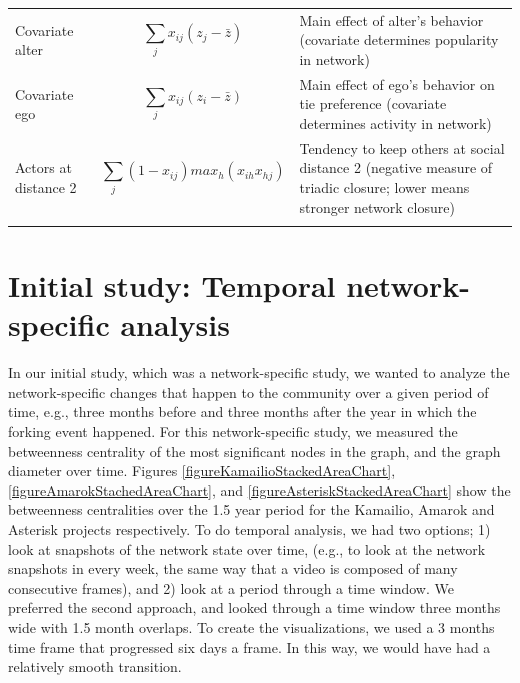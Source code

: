 \documentclass{report}
\begin{document}
\begin{table}[!ht]
\begin{tabular}{m{} m{} m{}}
Covariate alter & \begin{equation*} \sum_j x_{ij} (z_j - \bar z) \end{equation*} & Main effect of alter's behavior (covariate determines popularity in network) \\ 
Covariate ego & \begin{equation*} \sum_j x_{ij} (z_i - \bar z) \end{equation*} & Main effect of ego's behavior on tie preference (covariate determines activity in network) \\
Actors at distance 2 & \begin{equation*} \sum_j (1 - x_{ij}) max_h (x_{ih}x_{hj}) \end{equation*} & Tendency to keep others at social distance 2 (negative measure of triadic closure; lower means stronger network closure) \\ 
\noalign{\smallskip}\hline
\end{tabular}
\end{table}
\section{Initial study: Temporal network-specific analysis}
\label{sectionInitialStudy}
In our initial study\cite{AzarbakhtOpenSym2013}\cite{AzarbakhtOSS2013}\cite{AzarbakhtVLHCC2014}, which was a network-specific study, we wanted to analyze the network-specific changes that happen to the community over a given period of time, e.g., three months before and three months after the year in which the forking event happened. For this network-specific study, we measured the betweenness centrality \cite{Brandes} of the most significant nodes in the graph, and the graph diameter over time. Figures \ref{figureKamailioStackedAreaChart}, \ref{figureAmarokStachedAreaChart}, and \ref{figureAsteriskStackedAreaChart} show the betweenness centralities over the 1.5 year period for the Kamailio, Amarok and Asterisk projects respectively. To do temporal analysis, we had two options; 1) look at snapshots of the network state over time, (e.g., to look at the network snapshots in every week, the same way that a video is composed of many consecutive frames), and 2) look at a period through a time window. We preferred the second approach, and looked through a time window three months wide with 1.5 month overlaps. To create the visualizations, we used a 3 months time frame that progressed six days a frame. In this way, we would have had a relatively smooth transition.
\end{document}
